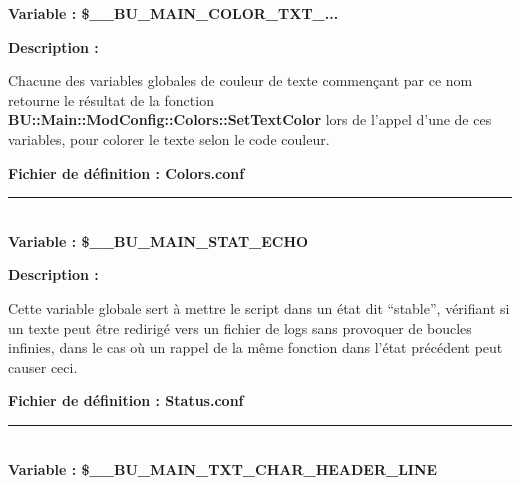 \documentclass[a4paper,10pt]{article}
\begin{document}
\textbf{Variable : \color{orange}\$\_\_BU\_MAIN\_COLOR\_TXT\_...}\\[1\baselineskip]

\begin{justify}\setlength{\parskip}{2em}
    \textbf{Description :}
\end{justify}\setlength{\parskip}{1em}

\begin{justify}
    Chacune des variables globales de couleur de texte commençant par ce nom retourne le résultat de la fonction \textbf{\color{mauve}BU::Main::ModConfig::Colors::SetTextColor} lors de l'appel d'une de ces variables, pour colorer le texte selon le code couleur.
\end{justify}

\textbf{Fichier de définition : \color{lime}Colors.conf}\\[1\baselineskip]



\color{orange}\par\noindent\rule{\textwidth}{0.4pt}\color{white}\\[1\baselineskip]

\textbf{Variable : \color{orange}\$\_\_BU\_MAIN\_STAT\_ECHO}\\[1\baselineskip]

\begin{justify}\setlength{\parskip}{2em}
    \textbf{Description :}
\end{justify}\setlength{\parskip}{1em}

\begin{justify}
    Cette variable globale sert à mettre le script dans un état dit ``stable'', vérifiant si un texte peut être redirigé vers un fichier de logs sans provoquer de boucles infinies, dans le cas où un rappel de la même fonction dans l'état précédent peut causer ceci.
\end{justify}

\textbf{Fichier de définition : \color{lime}Status.conf}\\[1\baselineskip]



\color{orange}\par\noindent\rule{\textwidth}{0.4pt}\color{white}\\[1\baselineskip]

\textbf{Variable : \color{orange}\$\_\_BU\_MAIN\_TXT\_CHAR\_HEADER\_LINE}\\[1\baselineskip]
\end{document}
